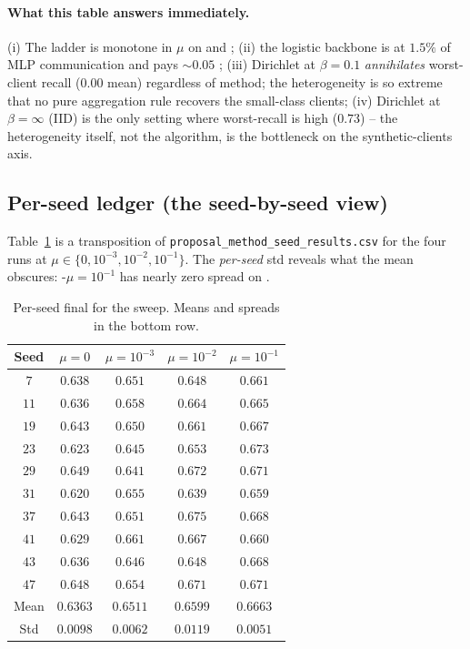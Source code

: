 \paragraph{What this table answers immediately.}
(i) The \fedprox{} ladder is monotone in $\mu$ on \auroc{} and
\auprc{}; (ii) the logistic backbone is at $1.5\%$ of MLP
communication and pays $\sim$$0.05$ \auprc{}; (iii) Dirichlet at
$\beta\!=\!0.1$ \emph{annihilates} worst-client recall ($0.00$
mean) regardless of method; the heterogeneity is so extreme that no
pure aggregation rule recovers the small-class clients;
(iv) Dirichlet at $\beta\!=\!\infty$ (IID) is the only setting where
worst-recall is high ($0.73$) -- the heterogeneity itself, not the
algorithm, is the bottleneck on the synthetic-clients axis.

\subsection{Per-seed \fedprox{} ledger (the seed-by-seed view)}

Table~\ref{tab:fedprox-perseed} is a transposition of
\texttt{proposal\_method\_seed\_results.csv} for the four \fedprox{}
runs at $\mu \!\in\! \{0, 10^{-3}, 10^{-2}, 10^{-1}\}$. The
\textit{per-seed} std reveals what the mean obscures:
\fedprox{}-$\mu\!=\!10^{-1}$ has nearly zero spread on \auprc{}.

\begin{table}[h]
\centering
\caption{Per-seed final \auprc{} for the \fedprox{} sweep. Means and
spreads in the bottom row.}
\label{tab:fedprox-perseed}
\small
\begin{tabular}{c | c c c c}
\toprule
Seed & $\mu\!=\!0$ & $\mu\!=\!10^{-3}$ & $\mu\!=\!10^{-2}$ & $\mu\!=\!10^{-1}$ \\
\midrule
$7$  & $0.638$ & $0.651$ & $0.648$ & $0.661$ \\
$11$ & $0.636$ & $0.658$ & $0.664$ & $0.665$ \\
$19$ & $0.643$ & $0.650$ & $0.661$ & $0.667$ \\
$23$ & $0.623$ & $0.645$ & $0.653$ & $0.673$ \\
$29$ & $0.649$ & $0.641$ & $0.672$ & $0.671$ \\
$31$ & $0.620$ & $0.655$ & $0.639$ & $0.659$ \\
$37$ & $0.643$ & $0.651$ & $0.675$ & $0.668$ \\
$41$ & $0.629$ & $0.661$ & $0.667$ & $0.660$ \\
$43$ & $0.636$ & $0.646$ & $0.648$ & $0.668$ \\
$47$ & $0.648$ & $0.654$ & $0.671$ & $0.671$ \\
\midrule
Mean & $0.6363$ & $0.6511$ & $0.6599$ & $0.6663$ \\
Std  & $0.0098$ & $0.0062$ & $0.0119$ & $0.0051$ \\
\bottomrule
\end{tabular}
\end{table}

